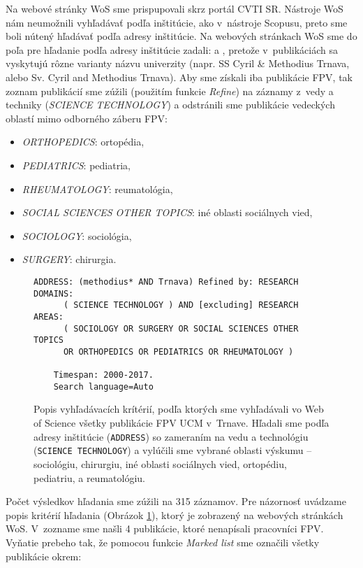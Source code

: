 Na webové stránky WoS sme prispupovali skrz portál CVTI SR. Nástroje WoS nám
neumožnili vyhľadávať podľa inštitúcie, ako v~nástroje Scopusu, preto sme boli
nútený hľadávať podľa adresy inštitúcie. Na webových stránkach WoS sme do poľa
pre hľadanie podľa adresy inštitúcie zadali:  a ,
pretože v~publikáciách sa vyskytujú rôzne varianty názvu univerzity (napr. SS
Cyril \& Methodius Trnava, alebo Sv. Cyril and Methodius Trnava).  Aby sme
získali iba publikácie FPV, tak zoznam publikácií sme zúžili (použitím funkcie
\emph{Refine}) na záznamy z~vedy a techniky (\emph{SCIENCE TECHNOLOGY}) a
odstránili sme publikácie vedeckých oblastí mimo odborného záberu FPV:

\begin{itemize}
  \item \emph{ORTHOPEDICS}: ortopédia,
  \item \emph{PEDIATRICS}: pediatria, 
  \item \emph{RHEUMATOLOGY}: reumatológia,
  \item \emph{SOCIAL SCIENCES OTHER TOPICS}: iné oblasti sociálnych vied,
  \item \emph{SOCIOLOGY}: sociológia,
  \item \emph{SURGERY}: chirurgia.
\end{itemize}

\begin{figure}
  \footnotesize
  \begin{Verbatim}[frame=single]
    ADDRESS: (methodius* AND Trnava) Refined by: RESEARCH DOMAINS: 
      ( SCIENCE TECHNOLOGY ) AND [excluding] RESEARCH AREAS: 
      ( SOCIOLOGY OR SURGERY OR SOCIAL SCIENCES OTHER TOPICS 
      OR ORTHOPEDICS OR PEDIATRICS OR RHEUMATOLOGY ) 

    Timespan: 2000-2017.
    Search language=Auto
  \end{Verbatim}
  \vspace*{-4mm}
  \caption[Popis kritérií vyhľadávania vo WoS pre FPV]{Popis vyhľadávacích
  krítérií, podľa ktorých sme vyhľadávali vo Web of Science všetky publikácie
  FPV UCM v~Trnave.  Hľadali sme podľa adresy inštitúcie (\texttt{ADDRESS}) so zameraním
  na vedu a technológiu (\texttt{SCIENCE TECHNOLOGY}) a vylúčili sme vybrané
  oblasti výskumu -- sociológiu, chirurgiu, iné oblasti sociálnych vied,
  ortopédiu, pediatriu, a reumatológiu.}
  \label{fig:wos.query}
\end{figure}


Počet výsledkov hľadania sme zúžili na 315 záznamov. Pre názornosť uvádzame
popis kritérií hľadania (Obrázok \ref{fig:wos.query}), ktorý je zobrazený na
webových stránkách WoS.  V~zozname sme našli 4 publikácie, ktoré nenapísali
pracovníci FPV.  Vyňatie prebeho tak, že pomocou funkcie \emph{Marked list} sme
označili všetky publikácie okrem: 

